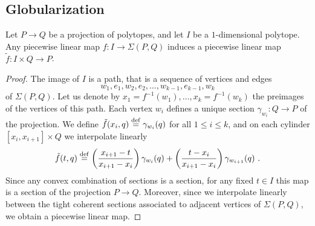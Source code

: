 
\subsection{Globularization} 
\label{ss:globularization}


\begin{lemma}
	\label{l:adjunction-I}
	Let $P \to Q$ be a projection of polytopes, and let $I$ be a $1$-dimensional polytope. 
	Any piecewise linear map $f \colon I \to \Sigma(P,Q)$ induces a piecewise linear map $\tilde f \colon I \times Q \to P$. 
\end{lemma}

\begin{proof}
	The image of $I$ is a path, that is a sequence of vertices and edges $$w_1,e_1,w_2,e_2,\ldots,w_{k-1},e_{k-1},w_k$$ of $\Sigma(P,Q)$. 
	Let us denote by $x_1=f^{-1}(w_1),\ldots, x_k=f^{-1}(w_k)$ the preimages of the vertices of this path. 
	Each vertex $w_i$ defines a unique section $\gamma_{w_i} : Q \to P$ of the projection.
	We define $\tilde f (x_i, q) \stackrel{\mathrm{def}}{=} \gamma_{w_i}(q)$ for all $1 \leq i \leq k$, and on each cylinder $[x_i,x_{i+1}] \times Q$ we interpolate linearly
	\[
	\tilde f (t,q) \defeq \left( \frac{x_{i+1}-t}{x_{i+1}-x_i} \right) \gamma_{w_i}(q) + \left( \frac{t-x_i}{x_{i+1}-x_i} \right) \gamma_{w_{i+1}}(q) \ .
	\]
	Since any convex combination of sections is a section, for any fixed $t\in I$ this map is a section of the projection $P \to Q$.
	Moreover, since we interpolate linearly between the tight coherent sections associated to adjacent vertices of $\Sigma(P,Q)$, we obtain a piecewise linear map. 
\end{proof}

